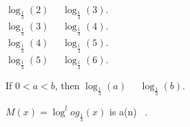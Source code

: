 \documentclass{ximera}
\begin{document}
\begin{example}
\begin{question}
$\log_{\tfrac{1}{3}}(2)$ \, \wordChoice{\choice{$<$} \choice[correct]{$>$}} \, $\log_{\tfrac{1}{3}}(3)$.  \\

$\log_{\tfrac{1}{3}}(3)$ \, \wordChoice{\choice{$<$} \choice[correct]{$>$}} \, $\log_{\tfrac{1}{3}}(4)$.  \\

$\log_{\tfrac{1}{3}}(4)$ \, \wordChoice{\choice{$<$} \choice[correct]{$>$}} \, $\log_{\tfrac{1}{3}}(5)$.  \\

$\log_{\tfrac{1}{3}}(5)$ \, \wordChoice{\choice{$<$} \choice[correct]{$>$}} \, $\log_{\tfrac{1}{3}}(6)$.  \\


\end{question}




\begin{question}



If $0 < a < b$, then $\log_{\tfrac{1}{3}}(a)$ \, \wordChoice{\choice{$<$} \choice[correct]{$>$}} \, $\log_{\tfrac{1}{3}}(b)$.  \\



\end{question}





\begin{question}



$M(x) = \log^log_{\tfrac{1}{3}}(x)$  is a(n) \,  .  \\



\end{question}








\end{example}
\end{document}
